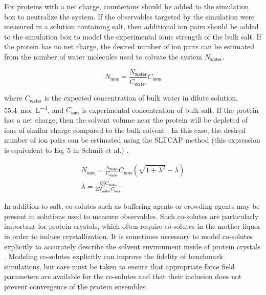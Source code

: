 \documentclass[9pt,review]{livecoms}
\begin{document}
For proteins with a net charge, counterions should be added to the simulation box to neutralize the system.
If the observables targeted by the simulation were measured in a solution containing salt, then additional ion pairs should be added to the simulation box to model the experimental ionic strength of the bulk salt.
If the protein has no net charge, the desired number of ion pairs can be estimated from the number of water molecules used to solvate the system $N_{\mathsf{water}}$.

\begin{equation}
\label{eqn:ions_neutral}
N_{\mathsf{ions}} = \frac {N_{\mathsf{water}}} {C_{\mathsf{water}}} C_{\mathsf{ions}}
\end{equation}

\noindent where $C_{\mathsf{water}}$ is the expected concentration of bulk water in dilute solution, \qty{55.4}{\mol\per\liter}, and $C_{\mathsf{ions}}$ is experimental concentration of bulk salt.
If the protein has a net charge, then the solvent volume near the protein will be depleted of ions of similar charge compared to the bulk solvent \cite{schmit_sltcap_2018}.
In this case, the desired number of ion pairs can be estimated using the SLTCAP method (this expression is equivalent to Eq. 5 in Schmit et al.) \cite{schmit_sltcap_2018}.

\begin{equation}
\label{eqn:ions_charged}
\begin{gathered}
N_{\mathsf{ions}} = \frac {N_{\mathsf{water}}} {C_{\mathsf{water}}} C_{\mathsf{ions}} \left( \sqrt{1 + \lambda^2} - \lambda \right) \\
\lambda = \frac {\left| Q \right| C_{\mathsf{water}}} {2 N_{\mathsf{water}} C_{\mathsf{ions}}}
\end{gathered}
\end{equation}

In addition to salt, co-solutes such as buffering agents or crowding agents may be present in solutions used to measure observables.
Such co-solutes are particularly important for protein crystals, which often require co-solutes in the mother liquor in order to induce crystallization.
It is sometimes necessary to model co-solutes explicitly to accurately describe the solvent environment inside of protein crystals \cite{wall_biomolecular_2019}.
Modeling co-solutes explicitly can improve the fidelity of benchmark simulations, but care must be taken to ensure that appropriate force field parameters are available for the co-solutes and that their inclusion does not prevent convergence of the protein ensembles.
\end{document}
